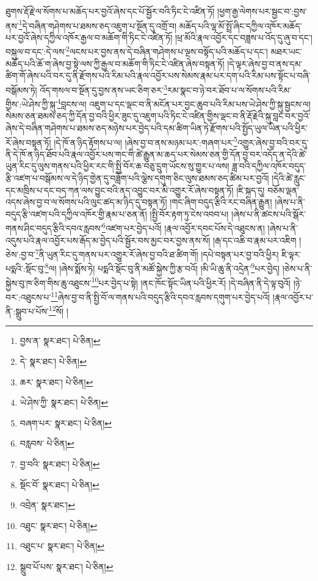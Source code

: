 ཐུགས་རྡོ་རྗེ་ལ་སོགས་པ་མཆོད་པར་བྱའོ་ཞེས་དང་པོ་སྦྱོར་བའི་ཏིང་ངེ་འཛིན་ཏོ། །ཕྱག་རྒྱ་ལེགས་པར་སྦྱང་བ་:བྱས་ནས་\footnote{བྱས་ན་  སྣར་ཐང་།  པེ་ཅིན། }དེ་བཞིན་གཤེགས་པ་ཐམས་ཅད་འཇུག་པ་སྔོན་དུ་འགྲོ་བ། མཆོད་པའི་ལྷ་མོ་སྤྲོ་ཞིང་དཀྱིལ་འཁོར་མཆོད་པར་བྱའོ་ཞེས་དཀྱིལ་འཁོར་རྒྱལ་བ་མཆོག་གི་ཏིང་ངེ་འཛིན་ཏོ། །ཕྲ་མོའི་རྣལ་འབྱོར་དང་བཟླས་པ་འོད་དུ་ཞུ་བ་དང་། བསྐུལ་བ་དང་:དེ་ལས་\footnote{དེ་  སྣར་ཐང་།  པེ་ཅིན། }ལངས་པར་བྱས་ནས་དེ་བཞིན་གཤེགས་པ་ལྔས་བསྟོད་པའི་མཆོད་པ་དང་། མཐར་ཡང་མཆོད་པའི་ཆོ་ག་ཞེས་བྱ་སྟེ་ལས་ཀྱི་རྒྱལ་བ་མཆོག་གི་ཏིང་ངེ་འཛིན་ཞེས་བསྟན་ཏོ། །དེ་ལྟར་ཞེས་བྱ་བ་ནས་དམ་ཚིག་གོ་ཞེས་པའི་བར་དུ་ནི་རྫོགས་པའི་རིམ་པའི་རྣལ་འབྱོར་པས་སེམས་རྣམ་པར་དག་པའི་རིམ་པས་སྟོང་པ་བཞི་བསྒོམས་ཏེ། འོད་གསལ་བ་སྔོན་དུ་བྱས་ནས་ཡང་ཅིག་ཅར་\footnote{ཆར་  སྣར་ཐང་།  པེ་ཅིན། }རམ་སྣང་བ་ཉེ་བར་ཐོབ་པ་ལ་སོགས་པའི་རིམ་གྱིས་:ཡེ་ཤེས་ཀྱི་སྐུ་\footnote{ཡེ་ཤེས་ཀྱི་  སྣར་ཐང་།  པེ་ཅིན། }བླངས་ལ། འཇུག་པ་དང་ལྡང་བ་ནི་མངོན་པར་བྱང་ཆུབ་པའི་རིམ་པས་ཡེ་ཤེས་ཀྱི་སྐུ་སྦྱངས་ལ། སེམས་ཅན་ཐམས་ཅད་ཀྱི་དོན་བྱ་བའི་ཕྱིར་ཟུང་དུ་འཇུག་པའི་ཏིང་ངེ་འཛིན་གྱིས་ལྡང་བ་ནི་རྡོ་རྗེའི་སྐུ་བླང་བར་བྱའོ་ཞེས་དེ་བཞིན་གཤེགས་པ་ཐམས་ཅད་མཉེས་པར་བྱེད་པའི་དམ་ཚིག་ཡིན་ཏེ་རྫོགས་པའི་སྤྱོད་ཡུལ་ཡིན་པའི་ཕྱིར་རོ་ཞེས་བསྟན་ཏོ། །དེ་ཁོ་ན་ཉིད་རྟོགས་པ་ལ། །ཞེས་བྱ་བ་ནས་མཉམ་པར་:གཞག་པར་\footnote{བཞག་པར་  སྣར་ཐང་།  པེ་ཅིན། }འགྱུར་ཞེས་བྱ་བའི་བར་དུ་ནི་དེ་ཁོ་ན་ཉིད་ཐོབ་པའི་རྣལ་འབྱོར་པས་གང་གི་ཚེ་རྒྱུན་མ་ཆད་པར་སེམས་ཅན་གྱི་དོན་བྱ་བར་འདོད་ན་དེའི་ཚེ་ཡུན་རིང་དུ་ལུས་གནས་པའི་ཕྱིར་རང་གི་སྤྱི་བོར་ཆ་བཅུ་དྲུག་ཡོངས་སུ་གྱུར་པ་ལས། ཟླ་བའི་དཀྱིལ་འཁོར་བདུད་རྩི་འཛག་པ་བསྒོམས་ལ་དེ་ཉིད་གྱེན་དུ་བཟློག་པའི་ལྕེས་དགུག་ཅིང་ལུས་ཐམས་ཅད་ཚིམ་པར་བྱའོ། །དེའི་ཚེ་རླུང་དང་མཁྲིས་པ་དང་བད་ཀན་ལས་བྱུང་བའི་ནད་འབྱུང་བར་མི་འགྱུར་རོ་ཞེས་བསྟན་ཏོ། །ཇི་སྐད་དུ། བཅོམ་ལྡན་འདས་ཞེས་བྱ་བ་ལ་སོགས་པའི་ལུང་ཚད་མ་ཉིད་དུ་བསྟན་ཏོ། །གང་ཞིག་བདུད་རྩིའི་རང་བཞིན་རྒྱུན། །ཞེས་པ་ནི་བདུད་རྩི་འཛག་པའི་དཀྱིལ་འཁོར་གྱི་རྣམ་པ་ཅན་ནོ། །སྤྱི་བོར་རྟག་ཏུ་ངེས་འབབ་པ། །ཞེས་པ་ནི་ཚངས་པའི་སྒོར་གནས་ཤིང་བདུད་རྩིའི་དབའ་རླབས་\footnote{བརླབས་  པེ་ཅིན། }འཛག་པར་བྱེད་པའོ། །རྣལ་འབྱོར་དབང་པོས་དེ་འཐུངས་ན། །ཞེས་པ་ནི་འདུས་པའི་རྣལ་འབྱོར་པས་རྒོད་མ་བྱེད་པའི་སྦྱོར་བས་མྱང་བར་བྱས་ནས་སོ། །རྒ་དང་འཆི་བ་རྣམ་པར་འཇིག །ཅེས་:བྱ་བ་\footnote{བྱ་བའི་  སྣར་ཐང་།  པེ་ཅིན། }ནི་ཡུན་རིང་དུ་གནས་པར་འགྱུར་རོ་ཞེས་བྱ་བའི་ཐ་ཚིག་གོ། །དཔེ་བསྟན་པར་བྱ་བའི་ཕྱིར། ཇི་ལྟར་པདྨའི་:སྡོང་བུ་\footnote{སྡོང་བོ་  སྣར་ཐང་།  པེ་ཅིན། }ལ། །ཞེས་སྨོས་ཏེ། པདྨའི་སྡོང་བུ་ནི་མཚོ་སྐྱེས་ཀྱི་རྩ་བའོ། །མི་ཡི་ཆུ་ནི་འདྲེན་\footnote{འབྲེན་  སྣར་ཐང་། }པར་བྱེད། །ཅེས་པ་ནི་སྐྱེས་བུ་ཁ་ཅིག་གིས་ཆུ་འཐུངས་\footnote{འཐུང་  སྣར་ཐང་།  པེ་ཅིན། }པར་བྱེད་པ་སྟེ། །ནང་ཁོང་སྟོང་ཡིན་པའི་ཕྱིར་རོ། །དེ་བཞིན་ནི་དེ་ལྟ་བུའོ། །ཉེ་བར་:འཐུངས་པ་\footnote{འཐུང་པ་  སྣར་ཐང་།  པེ་ཅིན། }ཞེས་བྱ་བ་ནི་སྤྱི་བོ་ལ་གནས་པའི་བདུད་རྩིའི་དབའ་རླབས་དགུག་པར་བྱེད་པའོ། །རྣལ་འབྱོར་པ་ནི་:སྒྲུབ་པ་པོས་\footnote{སྒྲུབ་པོ་པས་  སྣར་ཐང་།  པེ་ཅིན། }སོ། །
